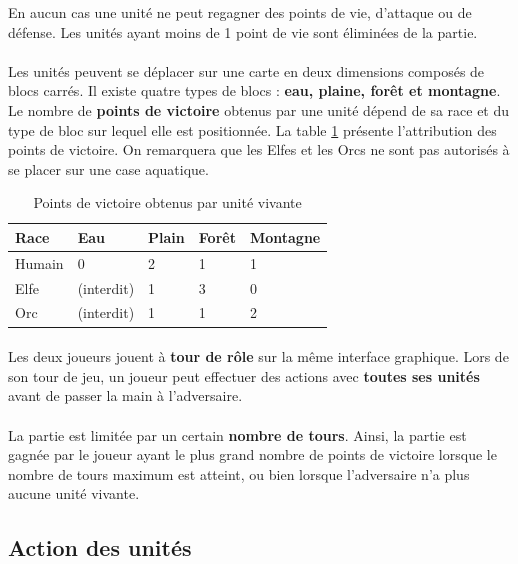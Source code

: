 En aucun cas une unité ne peut regagner des points de vie, d'attaque ou de défense. Les unités ayant moins de 1 point de vie sont éliminées de la partie.

\paragraph{}
Les unités peuvent se déplacer sur une carte en deux dimensions composés de blocs carrés.
Il existe quatre types de blocs : \textbf{eau, plaine, forêt et montagne}. Le nombre de \textbf{points de victoire} obtenus par une unité dépend de sa race et du type de bloc sur lequel elle est positionnée.
La table \ref{fig:victory_points} présente l'attribution des points de victoire. On remarquera que les Elfes et les Orcs ne sont pas autorisés à se placer sur une case aquatique.

\begin{table}[h!]
  \centering
  \begin{tabular}{|l|l|l|l|l|}
    \hline
    Race&Eau&Plain&Forêt&Montagne\\
    \hline
    Humain&0&2&1&1\\
    \hline
    Elfe&(interdit)&1&3&0\\
    \hline
    Orc&(interdit)&1&1&2\\
    \hline
  \end{tabular}
  \caption{Points de victoire obtenus par unité vivante}
  \label{fig:victory_points}
\end{table}

\paragraph{}
Les deux joueurs jouent à \textbf{tour de rôle} sur la même interface graphique. Lors de son tour de jeu, un joueur peut effectuer des actions avec \textbf{toutes ses unités} avant de passer la main à l'adversaire.

\paragraph{}
La partie est limitée par un certain \textbf{nombre de tours}. Ainsi, la partie est gagnée par le joueur ayant le plus grand nombre de points de victoire lorsque le nombre de tours maximum est atteint, ou bien lorsque l'adversaire n'a plus aucune unité vivante.

\subsection{Action des unités}

